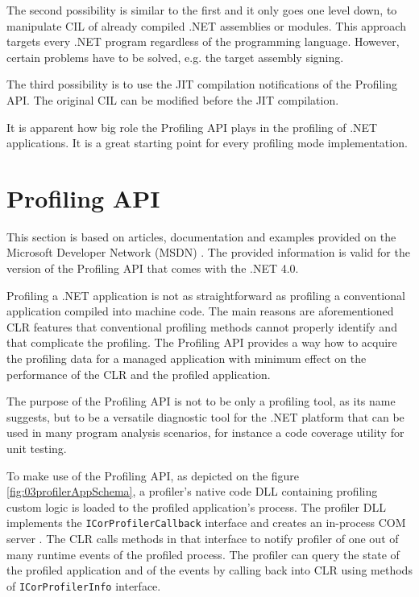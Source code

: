 The second possibility is similar to the first and it only goes one level down, to manipulate CIL of already compiled .NET assemblies or modules. This approach targets every .NET program regardless of the programming language. However, certain problems have to be solved, e.g. the target assembly signing.

The third possibility is to use the JIT compilation notifications of the Profiling API. The original CIL can be modified before the JIT compilation.

It is apparent how big role the Profiling API plays in the profiling of .NET applications. It is a great starting point for every profiling mode implementation.

\section{Profiling API}
This section is based on articles, documentation and examples provided on the Microsoft Developer Network (MSDN) \cite{ProfMSDN}. The provided information is valid for the version of the Profiling API that comes with the .NET 4.0. 

Profiling a .NET application is not as straightforward as profiling a conventional application compiled into machine code. The main reasons are aforementioned CLR features that conventional profiling methods cannot properly identify and that complicate the profiling. The Profiling API provides a way how to acquire the profiling data for a managed application with minimum effect on the performance of the CLR and the profiled application. 

The purpose of the Profiling API is not to be only a profiling tool, as its name suggests, but to be a versatile diagnostic tool for the .NET platform that can be used in many program analysis scenarios, for instance a code coverage utility for unit testing.

To make use of the Profiling API, as depicted on the figure \ref{fig:03profilerAppSchema}, a profiler's native code DLL containing profiling custom logic is loaded to the profiled application's process. The profiler DLL implements the \texttt{ICorProfilerCallback} interface and creates an in-process COM server . The CLR calls methods in that interface to notify profiler of one out of many runtime events of the profiled process. The profiler can query the state of the profiled application and of the events by calling back into CLR using methods of \texttt{ICorProfilerInfo} interface.

